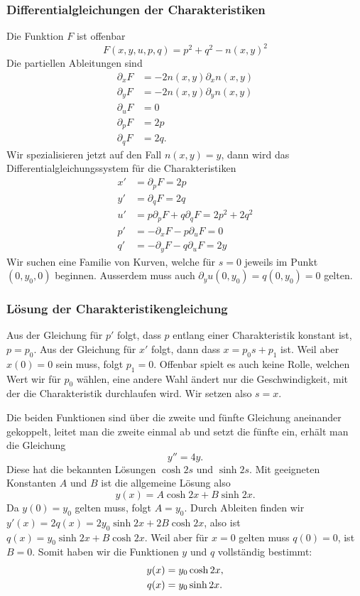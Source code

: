 \subsubsection{Differentialgleichungen der Charakteristiken}
Die Funktion $F$ ist offenbar
\[
F(x,y,u,p,q)=p^2+q^2-n(x,y)^2
\]
Die partiellen Ableitungen sind
\begin{align*}
\partial_xF&=-2n(x,y)\partial_x n(x,y)\\
\partial_yF&=-2n(x,y)\partial_y n(x,y)\\
\partial_uF&=0\\
\partial_pF&=2p\\
\partial_qF&=2q.
\end{align*}
Wir spezialisieren jetzt auf den Fall $n(x,y)=y$, dann wird das 
Differentialgleichungssystem für die Charakteristiken
\begin{align*}
x'&=\partial_pF=2p\\
y'&=\partial_qF=2q\\
u'&=p\partial_pF+q\partial_qF=2p^2+2q^2\\
p'&=-\partial_xF-p\partial_uF=0\\
q'&=-\partial_yF-q\partial_uF=2y
\end{align*}
Wir suchen eine Familie von Kurven, welche für $s=0$ jeweils
im Punkt $(0,y_0,0)$ beginnen.
Ausserdem muss auch $\partial_yu(0,y_0)=q(0,y_0)=0$ gelten.

\subsubsection{Lösung der Charakteristikengleichung}
Aus der Gleichung für $p'$ folgt, dass $p$ entlang einer Charakteristik
konstant ist, $p=p_0$. Aus der Gleichung für $x'$ folgt, dann
dass $x=p_0s+p_1$ ist. Weil aber $x(0)=0$ sein muss, folgt $p_1=0$.
Offenbar spielt es auch keine Rolle, welchen Wert wir für $p_0$
wählen, eine andere Wahl ändert nur die Geschwindigkeit, mit der
die Charakteristik durchlaufen wird. Wir setzen also $s=x$.

Die beiden Funktionen sind über die zweite und fünfte Gleichung
aneinander gekoppelt, leitet man die zweite einmal ab und setzt die
fünfte ein, erhält man die Gleichung
\[
y''=4y.
\]
Diese hat die bekannten Lösungen $\cosh 2s$ und $\sinh 2s$.
Mit geeigneten Konstanten $A$ und $B$ ist die allgemeine
Lösung also
\[
y(x)=A\cosh 2x + B\sinh 2x.
\]
Da $y(0)=y_0$ gelten muss, folgt $A=y_0$. Durch Ableiten finden wir
$y'(x)=2q(x)=2y_0\sinh 2x + 2B\cosh 2x$, also ist $q(x)=y_0\sinh 2x+B\cosh 2x$. 
Weil aber für $x=0$ gelten muss $q(0)=0$, ist $B=0$.
Somit haben wir die Funktionen $y$ und $q$ vollständig bestimmt:
\begin{align}
y(x)&=y_0\cosh 2x,
\label{nichtlinear:y}
\\
q(x)&=y_0\sinh 2x.\notag
\end{align}


